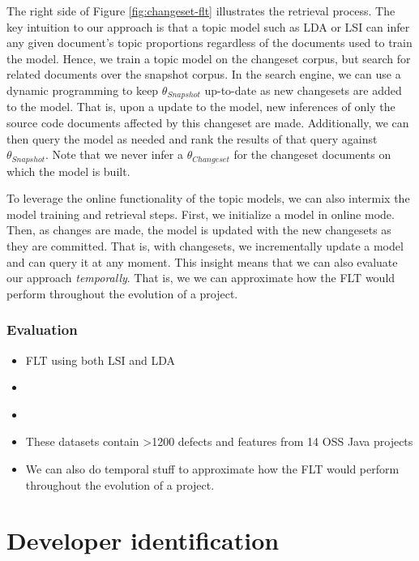 \documentclass[12pt,draft]{Manuscript}
\begin{document}
\begin{body}
The right side of Figure \ref{fig:changeset-flt} illustrates the
retrieval process. The key intuition to our approach is that a topic
model such as LDA or LSI can infer any given document's topic
proportions regardless of the documents used to train the model. Hence,
we train a topic model on the changeset corpus, but search for related
documents over the snapshot corpus. In the search engine, we can use a
dynamic programming to keep \(\theta_{Snapshot}\) up-to-date as new
changesets are added to the model. That is, upon a update to the model,
new inferences of only the source code documents affected by this
changeset are made. Additionally, we can then query the model as needed
and rank the results of that query against \(\theta_{Snapshot}\). Note
that we never infer a \(\theta_{Changeset}\) for the changeset documents
on which the model is built.

To leverage the online functionality of the topic models, we can also
intermix the model training and retrieval steps. First, we initialize a
model in online mode. Then, as changes are made, the model is updated
with the new changesets as they are committed. That is, with changesets,
we incrementally update a model and can query it at any moment. This
insight means that we can also evaluate our approach \emph{temporally}.
That is, we we can approximate how the FLT would perform throughout the
evolution of a project.

\subsubsection{Evaluation}\label{evaluation}

\begin{itemize}
\itemsep1pt\parskip0pt
\item
  FLT using both LSI and LDA
\item
  \citet{Dit-etal:2013}
\item
  \citet{Moreno-etal:2014}
\item
  These datasets contain \textgreater{}1200 defects and features from 14
  OSS Java projects
\item
  We can also do temporal stuff to approximate how the FLT would perform
  throughout the evolution of a project.
\end{itemize}

\section{Developer identification}\label{study-triage}


\end{body}
\end{document}
